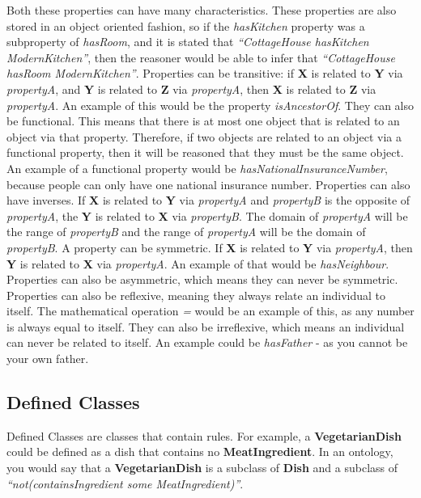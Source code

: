 Both these properties can have many characteristics. These properties are also stored in an object oriented fashion, so if the \textit{hasKitchen} property was a subproperty of \textit{hasRoom}, and it is stated that \textit{``CottageHouse hasKitchen ModernKitchen''}, then the reasoner would be able to infer that \textit{``CottageHouse hasRoom ModernKitchen''}. Properties can be transitive: if \textbf{X} is related to \textbf{Y} via \textit{propertyA}, and \textbf{Y} is related to \textbf{Z} via \textit{propertyA}, then \textbf{X} is related to \textbf{Z} via \textit{propertyA}. An example of this would be the property \textit{isAncestorOf}. They can also be functional. This means that there is at most one object that is related to an object via that property. Therefore, if two objects are related to an object via a functional property, then it will be reasoned that they must be the same object. An example of a functional property would be \textit{hasNationalInsuranceNumber}, because people can only have one national insurance number. Properties can also have inverses. If \textbf{X} is related to \textbf{Y} via \textit{propertyA} and \textit{propertyB} is the opposite of \textit{propertyA}, the \textbf{Y} is related to \textbf{X} via \textit{propertyB}. The domain of \textit{propertyA} will be the range of \textit{propertyB} and the range of \textit{propertyA} will be the domain of \textit{propertyB}. A property can be symmetric. If \textbf{X} is related to \textbf{Y} via \textit{propertyA}, then \textbf{Y} is related to \textbf{X} via \textit{propertyA}. An example of that would be \textit{hasNeighbour}. Properties can also be asymmetric, which means they can never be symmetric. Properties can also be reflexive, meaning they always relate an individual to itself. The mathematical operation \textit{=} would be an example of this, as any number is always equal to itself. They can also be irreflexive, which means an individual can never be related to itself. An example could be \textit{hasFather} - as you cannot be your own father.

\subsection{Defined Classes}

Defined Classes are classes that contain rules. For example, a \textbf{VegetarianDish} could be defined as a dish that contains no \textbf{MeatIngredient}. In an ontology, you would say that a \textbf{VegetarianDish} is a subclass of \textbf{Dish} and a subclass of \textit{``not(containsIngredient some MeatIngredient)''}.

